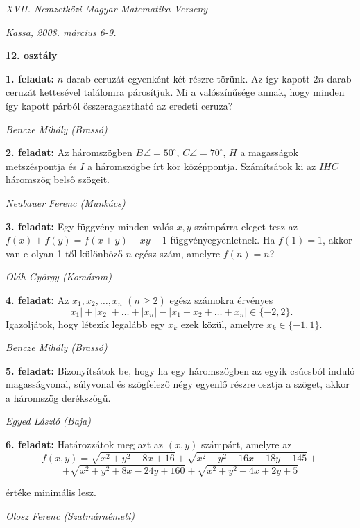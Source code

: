 \documentclass[a4paper,10pt]{article}
\def\ki#1#2{\hfill {\it #1 (#2)}\medskip}
\begin{document}
\begin{center} \Large {\em XVII. Nemzetközi Magyar Matematika Verseny} \end{center}
\begin{center} \large{\em Kassa, 2008. március 6-9.} \end{center}
\smallskip
\begin{center} \large{\bf 12. osztály} \end{center}
\bigskip 

{\bf 1. feladat: } $n$ darab ceruzát egyenként két részre törünk. Az így kapott $2n$ darab ceruzát kettesével találomra párosítjuk. Mi a valószínűsége annak, hogy minden így kapott párból összeragasztható az eredeti ceruza?

\ki{Bencze Mihály}{Brassó}\medskip

{\bf 2. feladat: } Az  háromszögben $B\angle=50^\circ$, $C\angle=70^\circ$, $H$ a magasságok metszéspontja és $I$ a háromszögbe írt kör középpontja. Számítsátok ki az $IHC$ háromszög belső szögeit.

\ki{Neubauer Ferenc}{Munkács}\medskip

{\bf 3. feladat: } Egy függvény minden valós  $x, y$ számpárra eleget tesz az $f(x)+f(y)=f(x+y)-xy-1$ függvényegyenletnek. Ha $f(1)=1$, akkor van-e olyan 1-től különböző $n$ egész szám, amelyre $f(n)=n$?

\ki{Oláh György}{Komárom}\medskip

{\bf 4. feladat: } Az $x_1, x_2,\dots, x_n$  $(n\ge 2)$ egész számokra érvényes 
     $$|x_1|+|x_2|+\dots+|x_n| - |x_1+ x_2+\dots+ x_n|\in
     \{-2, 2\}. $$
Igazoljátok, hogy létezik legalább egy $x_k$ ezek közül, amelyre $x_k\in \{-1, 1\}$.  

\ki{Bencze Mihály}{Brassó}\medskip

{\bf 5. feladat: } Bizonyítsátok be, hogy ha egy háromszögben az egyik csúcsból induló magasságvonal, súlyvonal és szögfelező négy egyenlő részre osztja a szöget, akkor a háromszög derékszögű. 

\ki{Egyed László}{Baja}\medskip

{\bf 6. feladat: } Határozzátok meg azt az $(x, y)$  számpárt, amelyre az 
$$f(x,y)=\sqrt{x^2+y^2-8x+16}+\sqrt{x^2+y^2-16x-18y+145}+$$ 
$$+\sqrt{x^2+y^2+8x-24y+160}+\sqrt{x^2+y^2+4x+2y+5}$$
		
értéke minimális lesz.

\ki{Olosz Ferenc}{Szatmárnémeti}\medskip

\vfill
\end{document}
